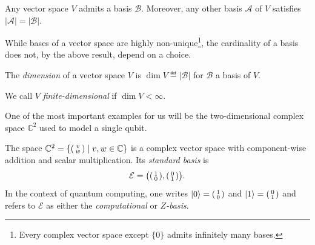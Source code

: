 \documentclass[a4paper, oneside, 12pt]{amsart}
\begin{document}
\begin{theorem}\label{thm:existence-of-bases-and-well-defd-dimension}
  Any vector space \(V\) admits a basis \(\mathcal{B}\).
  Moreover, any other basis \(\mathcal{A}\) of \(V\) satisfies \(|\mathcal{A}| = |\mathcal{B}|\).
\end{theorem}

While bases of a vector space are highly non-unique\footnote{Every complex vector space except \(\{0\}\) admits infinitely many bases.}, the cardinality of a basis does not, by the above result, depend on a choice.

\begin{definition}\label{def:finite-dimensional-vs}
  The \emph{dimension} of a vector space \(V\) is \(\dim V \eqdef | \mathcal{B}| \) for \(\mathcal{B}\) a basis of \(V\).

  We call \(V\) \emph{finite-dimensional} if \(\dim V < \infty\).
\end{definition}

One of the most important examples for us will be the two-dimensional complex space \( \mathbb{C}^{2}\) used to model a single qubit.

\begin{example}\label{ex:c2}
  The space \( \mathbb{C}^2=\{\begin{psmallmatrix} v \\ w \end{psmallmatrix} \mid v,w \in \mathbb{C}
  \}\) is a complex vector space with component-wise addition and scalar multiplication.
  Its \emph{standard basis} is
  \begin{equation*}
    \mathcal{E}= \big(\begin{psmallmatrix} 1 \\ 0 \end{psmallmatrix},
    \begin{psmallmatrix} 0 \\ 1 \end{psmallmatrix} \big).
  \end{equation*}
  In the context of quantum computing, one writes \(\lvert0\rangle = \begin{psmallmatrix} 1 \\ 0 \end{psmallmatrix}\) and \(\lvert1\rangle = \begin{psmallmatrix} 0 \\ 1 \end{psmallmatrix}\) and refers to \(\mathcal{E}\) as either the \emph{computational} or \emph{\(Z\)-basis}.
\end{example}
\end{document}
